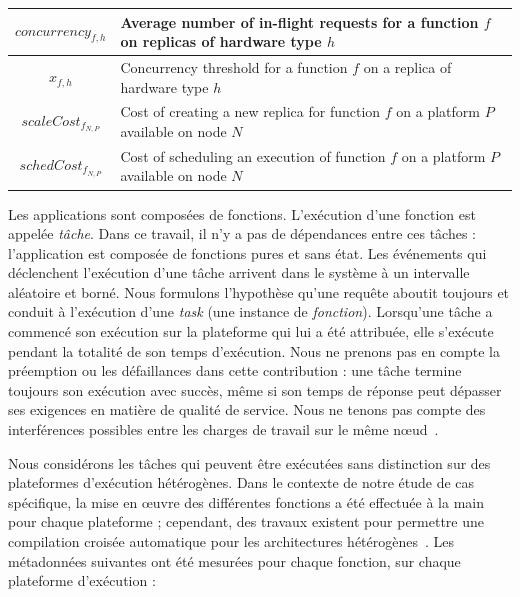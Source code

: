 \begin{table}[t]
\begin{center}
\begin{tabular}{|c|L|}
    $concurrency_{f, h}$ & Average number of in-flight requests for a function $f$ on replicas of hardware type $h$ \\ \hline
    $x_{f, h}$ & Concurrency threshold for a function $f$ on a replica of hardware type $h$ \\ \hline
    $scaleCost_{{f}_{N, P}}$ & Cost of creating a new replica for function $f$ on a platform $P$ available on node $N$ \\ \hline
    $schedCost_{{f}_{N, P}}$ & Cost of scheduling an execution of function $f$ on a platform $P$ available on node $N$ \\ \hline
    \end{tabular}
    \label{table:herofake-notation}
    \end{center}
\end{table}

Les applications sont composées de fonctions. L'exécution d'une fonction est appelée \textit{tâche}. Dans ce travail, il n'y a pas de dépendances entre ces tâches : l'application est composée de fonctions pures et sans état. Les événements qui déclenchent l'exécution d'une tâche arrivent dans le système à un intervalle aléatoire et borné. Nous formulons l'hypothèse qu'une requête aboutit toujours et conduit à l'exécution d'une \textit{task} (une instance de \textit{fonction}). Lorsqu'une tâche a commencé son exécution sur la plateforme qui lui a été attribuée, elle s'exécute pendant la totalité de son temps d'exécution. Nous ne prenons pas en compte la préemption ou les défaillances dans cette contribution : une tâche termine toujours son exécution avec succès, même si son temps de réponse peut dépasser ses exigences en matière de qualité de service. Nous ne tenons pas compte des interférences possibles entre les charges de travail sur le même nœud~\cite{dartoisInvestigatingMachineLearning2021}. 

Nous considérons les tâches qui peuvent être exécutées sans distinction sur des plateformes d'exécution hétérogènes. Dans le contexte de notre étude de cas spécifique, la mise en œuvre des différentes fonctions a été effectuée à la main pour chaque plateforme ; cependant, des travaux existent pour permettre une compilation croisée automatique pour les architectures hétérogènes~\cite{hortaXartrekRuntimeExecution2021, 10.1145/3445814.3446699}. Les métadonnées suivantes ont été mesurées pour chaque fonction, sur chaque plateforme d'exécution : 

